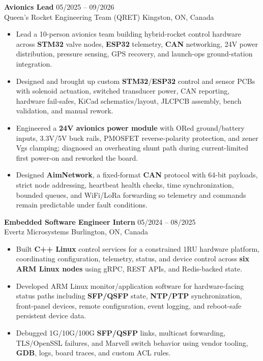 \documentclass[letterpaper,10pt]{article}
\begin{document}
    \noindent \textbf{Avionics Lead} \hfill 05/2025 -- 09/2026 \\
    Queen's Rocket Engineering Team (QRET) \hfill Kingston, ON, Canada
    \begin{itemize}
        \item Lead a 10-person avionics team building hybrid-rocket control hardware across \textbf{STM32} valve nodes, \textbf{ESP32} telemetry, \textbf{CAN} networking, 24V power distribution, pressure sensing, GPS recovery, and launch-ops ground-station integration.
        \item Designed and brought up custom \textbf{STM32}/\textbf{ESP32} control and sensor PCBs with solenoid actuation, switched transducer power, CAN reporting, hardware fail-safes, KiCad schematics/layout, JLCPCB assembly, bench validation, and manual rework.
        \item Engineered a \textbf{24V avionics power module} with ORed ground/battery inputs, 3.3V/5V buck rails, PMOSFET reverse-polarity protection, and zener Vgs clamping; diagnosed an overheating shunt path during current-limited first power-on and reworked the board.
        \item Designed \textbf{AimNetwork}, a fixed-format \textbf{CAN} protocol with 64-bit payloads, strict node addressing, heartbeat health checks, time synchronization, bounded queues, and WiFi/LoRa forwarding so telemetry and commands remain predictable under fault conditions.
    \end{itemize}

    \noindent \textbf{Embedded Software Engineer Intern} \hfill 05/2024 -- 08/2025 \\
    Evertz Microsystems \hfill Burlington, ON, Canada
    \begin{itemize}
        \item Built \textbf{C++ Linux} control services for a constrained 1RU hardware platform, coordinating configuration, telemetry, status, and device control across \textbf{six ARM Linux nodes} using gRPC, REST APIs, and Redis-backed state.
        \item Developed ARM Linux monitor/application software for hardware-facing status paths including \textbf{SFP/QSFP} state, \textbf{NTP/PTP} synchronization, front-panel devices, remote configuration, event logging, and reboot-safe persistent device data.
        \item Debugged 1G/10G/100G \textbf{SFP/QSFP} links, multicast forwarding, TLS/OpenSSL failures, and Marvell switch behavior using vendor tooling, \textbf{GDB}, logs, board traces, and custom ACL rules.
    \end{itemize}
\end{document}
